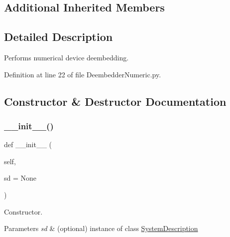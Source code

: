 \subsection*{Additional Inherited Members}


\subsection{Detailed Description}
Performs numerical device deembedding. 

Definition at line 22 of file Deembedder\+Numeric.\+py.



\subsection{Constructor \& Destructor Documentation}
\mbox{\label{classSignalIntegrity_1_1SystemDescriptions_1_1DeembedderNumeric_1_1DeembedderNumeric_a2fa2ae61a4511a760e2d2047ec07eb05}} 
\subsubsection{\texorpdfstring{\+\_\+\+\_\+init\+\_\+\+\_\+()}{\_\_init\_\_()}}
{\footnotesize\ttfamily def \+\_\+\+\_\+init\+\_\+\+\_\+ (\begin{DoxyParamCaption}\item[{}]{self,  }\item[{}]{sd = {\ttfamily None} }\end{DoxyParamCaption})}



Constructor. 


\begin{DoxyParams}{Parameters}
{\em sd} & (optional) instance of class \hyperlink{namespaceSignalIntegrity_1_1SystemDescriptions_1_1SystemDescription}{System\+Description} \\
\hline
\end{DoxyParams}


